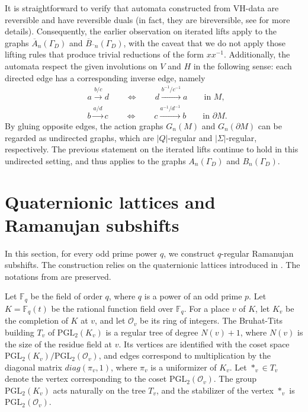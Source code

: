 \documentclass[12pt]{article}
\theoremstyle{definition}
\newtheorem{example}{Example}
\def\bF{{\mathbb F}}
\begin{document}
It is straightforward to verify that automata constructed from VH-data are reversible and have reversible duals (in fact, they are bireversible, see \cite{GlasnerMozes2005,BondarenkoKivva} for more details). Consequently, the earlier observation on iterated lifts apply to the graphs $\overline{A}_n(\Gamma_D)$ and $\overline{B}\overline{}_n(\Gamma_D)$, with the caveat that we do not apply those lifting rules that produce trivial reductions of the form $xx^{-1}$. Additionally, the automata respect the given involutions on $V$ and $H$ in the following sense: each directed edge has a corresponding inverse edge, namely
\begin{align*}
&a\xrightarrow{b/c} d \qquad \Leftrightarrow \qquad d\xrightarrow{b^{-1}/c^{-1}} a \qquad \mbox{in $M$},\\
&b\xrightarrow{a/d} c \qquad \Leftrightarrow \qquad c\xrightarrow{a^{-1}/d^{-1}} b \qquad \mbox{in $\partial M$}.
\end{align*}
By gluing opposite edges, the action graphs $G_n(M)$ and $G_n(\partial M)$ can be regarded as undirected graphs, which are $|Q|$-regular and $|\Sigma|$-regular, respectively. The previous statement on the iterated lifts continue to hold in this undirected setting, and thus applies to the graphs $A_n(\Gamma_D)$ and $B_n(\Gamma_D)$.



\section{Quaternionic lattices and Ramanujan subshifts}

In this section, for every odd prime power $q$, we construct $q$-regular Ramanujan subshifts.
The construction relies on the quaternionic lattices introduced in \cite{RSV2019}. The notations from \cite{RSV2019} are preserved.


Let $\bF_q$ be the field of order $q$, where $q$ is a power of an odd prime $p$. Let $K=\mathbb{F}_q(t)$ be the rational function field over $\mathbb{F}_q$. For a place $v$ of $K$, let $K_v$ be the completion of $K$ at $v$, and let $\mathcal{O}_{v}$ be its ring of integers. The Bruhat-Tits building \(T_v\) of \(\mathrm{PGL}_2(K_v)\) is a regular tree of degree \(N(v)+1\), where \(N(v)\) is the size of the residue field at $v$. Its vertices are identified with the coset space $\mathrm{PGL}_2(K_v)/\mathrm{PGL}_2(\mathcal{O}_{v})$, and edges correspond to multiplication by the diagonal matrix $diag(\pi_v,1)$, where $\pi_v$ is a uniformizer of $K_v$. Let $*_v\in T_v$ denote the vertex corresponding to the coset $\mathrm{PGL}_2(\mathcal{O}_{v})$. The group $\mathrm{PGL}_2(K_v)$ acts naturally on the tree $T_v$, and the stabilizer of the vertex $*_v$ is $\mathrm{PGL}_2(\mathcal{O}_{v})$.
\end{document}
